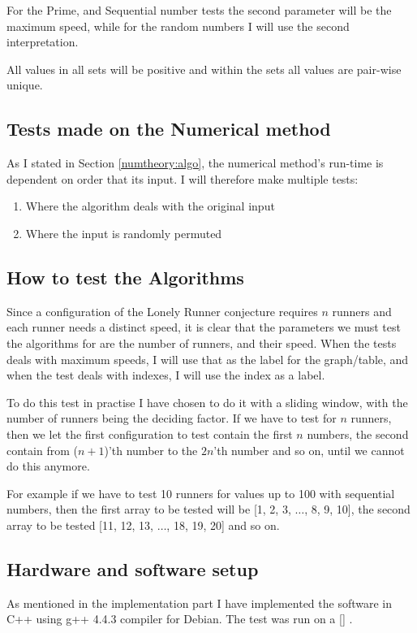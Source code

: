For the Prime, and Sequential number tests the second parameter will be the maximum speed, while for the random numbers I will use the second interpretation.

All values in all sets will be positive and within the sets all values are pair-wise unique.

\subsection{Tests made on the Numerical method}
As I stated in Section \ref{numtheory:algo}, the numerical
method's run-time is dependent on order that its input. I will
therefore make multiple tests:
\begin{enumerate}
\item Where the algorithm deals with the original input
\item Where the input is randomly permuted
\end{enumerate} 

\subsection{How to test the Algorithms}
Since a configuration of the Lonely Runner conjecture requires $n$ runners and each runner needs a distinct speed, it is clear that the parameters we must test the algorithms for are the number of runners, and their speed. When the tests deals with maximum speeds, I will use that as the label for the graph/table, and when the test deals with indexes, I will use the index as a label.

To do this test in practise I have chosen to do it with a sliding window, with the number of runners being the deciding factor. If we have to test for $n$ runners, then we let the first configuration to test contain the first $n$ numbers, the second contain from ($n+1$)'th number to the $2n$'th number and so on, until we cannot do this anymore.

For example if we have to test 10 runners for values up to 100 with sequential numbers, then the first array to be tested will be [1, 2, 3, $\ldots$, 8, 9, 10], the second array to be tested [11, 12, 13, $\ldots$, 18, 19, 20] and so on.



\subsection{Hardware and software setup}
As mentioned in the implementation part I have implemented the software in C++ using g++ 4.4.3 compiler for Debian. The test was run on a [] .

